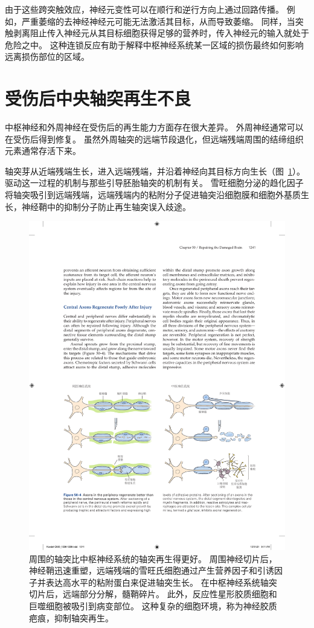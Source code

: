 由于这些跨突触效应，神经元变性可以在顺行和逆行方向上通过回路传播。
例如，严重萎缩的去神经神经元可能无法激活其目标，从而导致萎缩。
同样，当突触剥离阻止传入神经元从其目标细胞获得足够的营养时，传入神经元的输入就处于危险之中。
这种连锁反应有助于解释中枢神经系统某一区域的损伤最终如何影响远离损伤部位的区域。



\section{受伤后中央轴突再生不良}

中枢神经和外周神经在受伤后的再生能力方面存在很大差异。
外周神经通常可以在受伤后得到修复。
虽然外周轴突的远端节段退化，但远端残端周围的结缔组织元素通常存活下来。


轴突芽从近端残端生长，进入远端残端，并沿着神经向其目标方向生长（图~\ref{fig:50_4}）。
驱动这一过程的机制与那些引导胚胎轴突的机制有关。 雪旺细胞分泌的趋化因子将轴突吸引到远端残端，远端残端内的粘附分子促进轴突沿细胞膜和细胞外基质生长，神经鞘中的抑制分子防止再生轴突误入歧途。


\begin{figure}[htbp]
	\centering
	\includegraphics[width=1.0\linewidth]{chap50/fig_50_4}
	\caption{周围的轴突比中枢神经系统的轴突再生得更好。
		周围神经切片后，神经鞘迅速重塑，远端残端的雪旺氏细胞通过产生营养因子和引诱因子并表达高水平的粘附蛋白来促进轴突生长。
		在中枢神经系统轴突切片后，远端部分分解，髓鞘碎片。
		此外，反应性星形胶质细胞和巨噬细胞被吸引到病变部位。
		这种复杂的细胞环境，称为神经胶质疤痕，抑制轴突再生。}
	\label{fig:50_4}
\end{figure}


